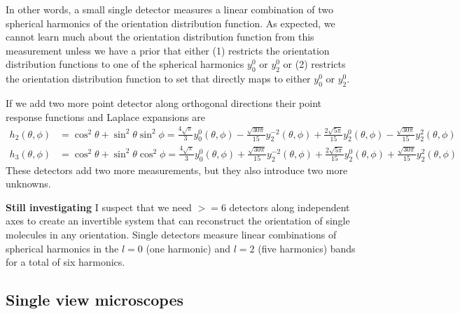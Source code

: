 \documentclass[10pt]{article}
\begin{document}
In other words, a small single detector measures a linear combination of two
spherical harmonics of the orientation distribution function. As expected, we
cannot learn much about the orientation distribution function from this
measurement unless we have a prior that either (1) restricts the orientation
distribution functions to one of the spherical harmonics $y_0^0$ or $y_2^0$ or
(2) restricts the orientation distribution function to set that directly maps to
either $y_0^0$ or $y_2^0$.

If we add two more point detector along orthogonal directions their point response
functions and Laplace expansions are
\begin{align}
  h_2(\theta, \phi) &= \cos^2\theta + \sin^2\theta\sin^2\phi = \frac{4\sqrt{\pi}}{3}y_0^0(\theta, \phi) - \frac{\sqrt{30\pi}}{15}y_2^{-2}(\theta, \phi) + \frac{2\sqrt{5\pi}}{15}y_2^{0}(\theta, \phi) - \frac{\sqrt{30\pi}}{15}y_2^2(\theta, \phi)\\
  h_3(\theta, \phi) &= \cos^2\theta + \sin^2\theta\cos^2\phi = \frac{4\sqrt{\pi}}{3}y_0^0(\theta, \phi) + \frac{\sqrt{30\pi}}{15}y_2^{-2}(\theta, \phi) + \frac{2\sqrt{5\pi}}{15}y_2^{0}(\theta, \phi) + \frac{\sqrt{30\pi}}{15}y_2^2(\theta, \phi)
\end{align}
These detectors add two more measurements, but they also introduce two more
unknowns.

\textbf{Still investigating} I suspect that we need $>=6$ detectors along
independent axes to create an invertible system that can reconstruct the
orientation of single molecules in any orientation. Single detectors measure
linear combinations of spherical harmonics in the $l=0$ (one harmonic) and $l=2$
(five harmonics) bands for a total of six harmonics.

\subsection{Single view microscopes}
\end{document}
